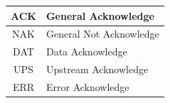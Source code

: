 \documentclass[preview]{standalone}
\begin{document}
\begin{tabular}{c|l}
    ACK & General Acknowledge\\
    \hline
    NAK & General Not Acknowledge\\
    \hline
    DAT & Data Acknowledge\\
    \hline
    UPS & Upstream Acknowledge\\
    \hline
    ERR & Error Acknowledge\\
\end{tabular}
\end{document}
